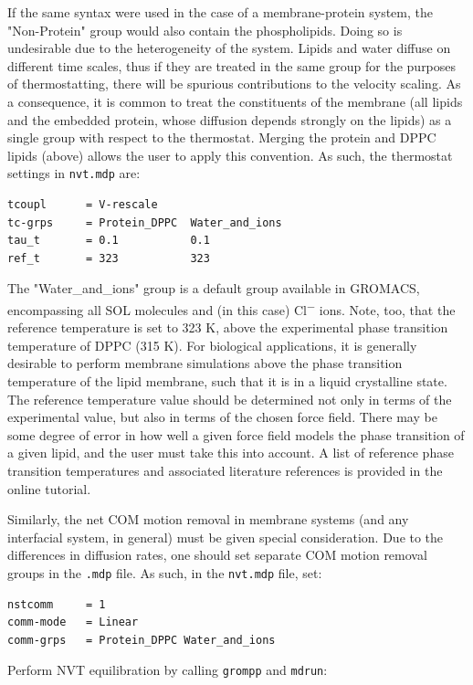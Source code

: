 \documentclass[9pt,tutorial,pubversion]{livecoms}
\begin{document}
If the same syntax were used in the case of a membrane-protein system, the "Non-Protein" group would also contain the phospholipids. Doing so is undesirable due to the heterogeneity of the system. Lipids and water diffuse on different time scales, thus if they are treated in the same group for the purposes of thermostatting, there will be spurious contributions to the velocity scaling. As a consequence, it is common to treat the constituents of the membrane (all lipids and the embedded protein, whose diffusion depends strongly on the lipids) as a single group with respect to the thermostat. Merging the protein and DPPC lipids (above) allows the user to apply this convention. As such, the thermostat settings in \texttt{nvt.mdp} are:

\begin{lstlisting}
tcoupl      = V-rescale
tc-grps     = Protein_DPPC  Water_and_ions
tau_t       = 0.1           0.1
ref_t       = 323           323
\end{lstlisting}

The "Water\_and\_ions" group is a default group available in GROMACS, encompassing all SOL molecules and (in this case) Cl\textsuperscript{$-$} ions. Note, too, that the reference temperature is set to 323 K, above the experimental phase transition temperature of DPPC (315 K). For biological applications, it is generally desirable to perform membrane simulations above the phase transition temperature of the lipid membrane, such that it is in a liquid crystalline state. The reference temperature value should be determined not only in terms of the experimental value, but also in terms of the chosen force field. There may be some degree of error in how well a given force field models the phase transition of a given lipid, and the user must take this into account. A list of reference phase transition temperatures and associated literature references is provided in the online tutorial.

Similarly, the net COM motion removal in membrane systems (and any interfacial system, in general) must be given special consideration. Due to the differences in diffusion rates, one should set separate COM motion removal groups in the \texttt{.mdp} file. As such, in the \texttt{nvt.mdp} file, set:

\begin{lstlisting}
nstcomm     = 1
comm-mode   = Linear
comm-grps   = Protein_DPPC Water_and_ions
\end{lstlisting}

Perform NVT equilibration by calling \texttt{grompp} and \texttt{mdrun}:
\end{document}
